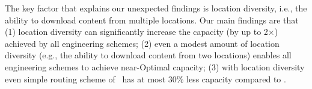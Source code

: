 The key factor that explains our unexpected findings is location diversity, i.e., the ability to download content from multiple locations. Our main findings are that (1) location diversity can significantly increase the capacity (by up to 2$\times$) achieved by all engineering schemes; (2) even a modest amount of location diversity (e.g., the ability to download content from two locations) enables all engineering schemes to achieve near-Optimal capacity; (3) with location diversity even simple routing scheme of \invcap\ has at most 30\% less capacity compared to \opt.









